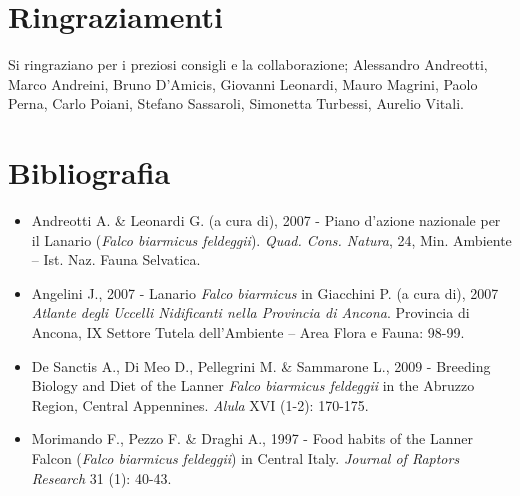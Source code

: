 \section*{Ringraziamenti}

Si ringraziano per i preziosi consigli e la collaborazione; Alessandro
Andreotti, Marco Andreini, Bruno D{\textquoteright}Amicis, Giovanni
Leonardi, Mauro Magrini, Paolo Perna, Carlo Poiani, Stefano Sassaroli,
Simonetta Turbessi, Aurelio Vitali.

\section*{Bibliografia}
\begin{itemize}\itemsep0pt
	\item Andreotti A. \& Leonardi G. (a cura di), 2007 - Piano
d{\textquoteright}azione nazionale per il Lanario (\textit{Falco
biarmicus feldeggii}). \textit{Quad. Cons. Natura}, 24, Min. Ambiente
-- Ist. Naz. Fauna Selvatica.

	\item Angelini J., 2007 - Lanario \textit{Falco biarmicus} in Giacchini P. (a
cura di), 2007 \textit{Atlante degli Uccelli Nidificanti nella
Provincia di Ancona}. Provincia di Ancona, IX Settore Tutela
dell{\textquoteright}Ambiente -- Area Flora e Fauna: 98-99.

	\item De Sanctis A., Di Meo D., Pellegrini M. \& Sammarone L., 2009 - Breeding
Biology and Diet of the Lanner \textit{Falco biarmicus feldeggii} in
the Abruzzo Region, Central Appennines. \textit{Alula} XVI (1-2):
170-175. 

	\item Morimando F., Pezzo F. \& Draghi A., 1997 - Food habits of the Lanner
Falcon (\textit{Falco biarmicus} \textit{feldeggii}) in Central Italy.
\textit{Journal of Raptors Research} 31 (1): 40-43.
\end{itemize}
